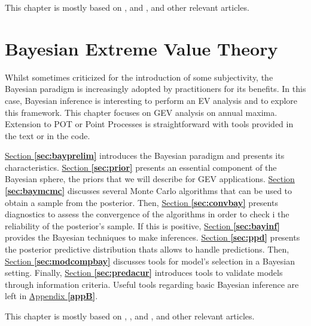 \documentclass[11pt,a4paper,openany, twosided]{book}
\begin{document}
This chapter is mostly based on \citet[chap.5-6]{coles_introduction_2001}, \citet[chap.10]{beirlant_statistics_2006} and \citet[chap.7]{reiss_statistical_2007}, and other relevant articles.
\newpage





\chapter{Bayesian Extreme Value Theory}\label{sec::bayesian}
\vspace{-1.5cm}
\minitoc\thispagestyle{empty}
 \vspace{0.1cm}


Whilst sometimes criticized for the introduction of some subjectivity, the Bayesian paradigm is increasingly adopted by practitioners for its benefits. In this case, Bayesian inference is interesting to perform an EV analysis and to explore this framework. This chapter focuses on GEV analysis on annual maxima. Extension to POT or Point Processes is straightforward with tools provided in the text or in the code.

\hyperref[sec:bayprelim]{Section \textbf{\ref{sec:bayprelim}}} introduces the Bayesian paradigm and presents its characteristics. \hyperref[sec:prior]{Section \textbf{\ref{sec:prior}}} presents an essential component of the Bayesian sphere, the priors that we will describe for GEV applications.
\hyperref[sec:baymcmc]{Section \textbf{\ref{sec:baymcmc}}} discusses several Monte Carlo algorithms that can be used to obtain a sample from the posterior. Then, \hyperref[sec:convbay]{Section \textbf{\ref{sec:convbay}}} presents diagnostics to assess the convergence of the algorithms in order to check i the reliability of the posterior's sample. If this is positive,
\hyperref[sec:bayinf]{Section \textbf{\ref{sec:bayinf}}} provides the Bayesian techniques to make inferences.
\hyperref[sec:ppd]{Section \textbf{\ref{sec:ppd}}} presents the posterior predictive distribution thats allows to handle predictions. Then, 
\hyperref[sec:modcompbay]{Section \textbf{\ref{sec:modcompbay}}} discusses tools for model's selection in a Bayesian setting. Finally,
\hyperref[sec:predacur]{Section \textbf{\ref{sec:predacur}}} introduces tools to validate models through information criteria.
Useful tools regarding basic Bayesian inference are left in \hyperref[appB]{Appendix \textbf{\ref{appB}}}.


This chapter is mostly based on \citet[sec. 9.1]{coles_introduction_2001},  \citet[chap.11]{beirlant_statistics_2006}, \citet[chap.13]{dey_extreme_2016} and \citet[chap.3]{ag_extremes_2013},  and other relevant articles.
\end{document}
